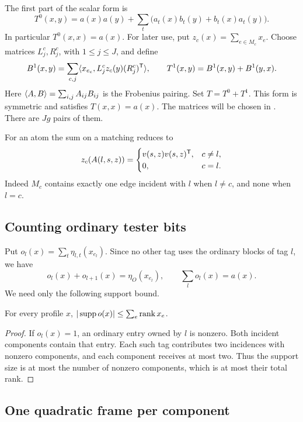 The first part of the scalar form is
\[
 T^0(x,y)=a(x)a(y)+\sum_t\bigl(a_t(x)b_t(y)+b_t(x)a_t(y)\bigr).
\]
In particular \(T^0(x,x)=a(x)\).
For later use, put \(z_c(x)=\sum_{e\in M_c}x_e\).
Choose matrices \(L_j^c,R_j^c\), with \(1\le j\le J\), and define
\begin{equation}\label{eq:reduced-mixer}
 B^1(x,y)=\sum_{c,j}\langle x_{e_c},L_j^c z_c(y)(R_j^c)^{\mathsf T}\rangle,
 \qquad T^1(x,y)=B^1(x,y)+B^1(y,x).
\end{equation}
Here \(\langle A,B\rangle=\sum_{i,j}A_{ij}B_{ij}\) is the Frobenius pairing. Set \(T=T^0+T^1\).
This form is symmetric and satisfies \(T(x,x)=a(x)\).
The matrices will be chosen in . There are \(Jg\)
pairs of them.

For an atom the sum on a matching reduces to
\begin{equation}\label{eq:matching-atom}
 z_c(A(l,s,z))=
 \begin{cases}v(s,z)v(s,z)^{\mathsf T},&c\ne l,\\0,&c=l.\end{cases}
\end{equation}
Indeed \(M_c\) contains exactly one edge incident with \(l\) when
\(l\ne c\), and none when \(l=c\).

\subsection{Counting ordinary tester bits}

Put \(o_l(x)=\sum_t\eta_{l,t}(x_{e_l})\). Since no other tag uses the ordinary blocks of tag \(l\), we have
\[
 o_l(x)+o_{l+1}(x)=\eta_O(x_{e_l}),\qquad
 \sum_l o_l(x)=a(x).
\]
We need only the following support bound.
\begin{lemma}\label{lem:ordinary-support}
For every profile \(x\), \(|\operatorname{supp} o(x)|\le\sum_e\operatorname{rank} x_e\).
\end{lemma}
\begin{proof}
If \(o_l(x)=1\), an ordinary entry owned by \(l\) is nonzero.
Both incident components contain that entry. Each such tag contributes
two incidences with nonzero components, and each component receives at
most two. Thus the support size is at most the number of nonzero
components, which is at most their total rank.
\end{proof}

\subsection{One quadratic frame per component}

